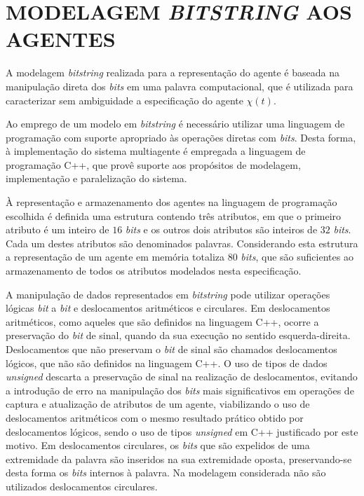 \section{MODELAGEM \textit{BITSTRING} AOS AGENTES}
\label{sec:modelagemBitstring}

A modelagem \textit{bitstring} realizada para a representação do agente é baseada na manipulação direta dos \textit{bits} em uma palavra computacional, que é utilizada para caracterizar sem ambiguidade a especificação do agente $\chi(t)$.

Ao emprego de um modelo em \textit{bitstring} é necessário utilizar uma linguagem de programação com suporte apropriado às operações diretas com \textit{bits}. Desta forma, à implementação do sistema multiagente é empregada a linguagem de programação C++, que provê suporte aos propósitos de modelagem, implementação e paralelização do sistema. 

À representação e armazenamento dos agentes na linguagem de programação escolhida é definida uma estrutura contendo três atributos, em que o primeiro atributo é um inteiro de $16$ \textit{bits} e os outros dois atributos são inteiros de $32$ \textit{bits}. Cada um destes atributos são denominados palavras. Considerando esta estrutura a representação de um agente em memória totaliza $80$ \textit{bits}, que são suficientes ao armazenamento de todos os atributos modelados nesta especificação. 

A manipulação de dados representados em \textit{bitstring} pode utilizar operações lógicas \textit{bit} a \textit{bit} e deslocamentos aritméticos e circulares. Em deslocamentos aritméticos, como aqueles que são definidos na linguagem C++, ocorre a preservação do \textit{bit} de sinal, quando da sua execução no sentido esquerda-direita. Deslocamentos que não preservam o \textit{bit} de sinal são chamados deslocamentos lógicos, que não são definidos na linguagem C++. O uso de tipos de dados \textit{unsigned} descarta a preservação de sinal na realização de deslocamentos, evitando a introdução de erro na manipulação dos \textit{bits} mais significativos em operações de captura e atualização de atributos de um agente, viabilizando o uso de deslocamentos aritméticos com o mesmo resultado prático obtido por deslocamentos lógicos, sendo o uso de tipos \textit{unsigned} em C++ justificado por este motivo. Em deslocamentos circulares, os \textit{bits} que são expelidos de uma extremidade da palavra são inseridos na sua extremidade oposta, preservando-se desta forma os \textit{bits} internos à palavra. Na modelagem considerada não são utilizados deslocamentos circulares. 

